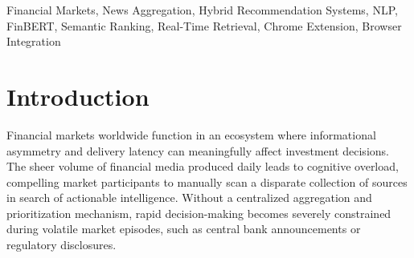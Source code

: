 \documentclass[conference]{IEEEtran}
\begin{document}
\begin{abstract}
Rapid growth in digital financial media has introduced substantial complexity in the timely processing and interpretation of market-sensitive content. Existing news platforms suffer from source fragmentation, irregular content freshness, and a near-total absence of user-adaptive features. In response to these shortcomings, this paper introduces \textit{FinMate.dev}, an extensible hybrid framework for real-time financial news aggregation and personalized recommendation. The system unifies multi-source RSS ingestion, content fingerprinting for deduplication, metadata normalization, distributed backend microservices, and a responsive client interface. A browser-native Chrome extension is also proposed, allowing users to access ranked financial content from within their active browsing session, removing the need to switch between applications. The ranking subsystem employs a composite scoring approach that fuses FinBERT-derived sentiment signals, transformer-based semantic embeddings, topic modeling outputs, and user behavioral analytics into a unified real-time scoring pipeline. Experimental validation demonstrates sustained ingestion throughput, sub-millisecond retrieval performance, and smooth rendering under large-scale financial feed conditions.
\end{abstract}

\begin{IEEEkeywords}
Financial Markets, News Aggregation, Hybrid Recommendation Systems, NLP, FinBERT, Semantic Ranking, Real-Time Retrieval, Chrome Extension, Browser Integration
\end{IEEEkeywords}

\section{Introduction}

Financial markets worldwide function in an ecosystem where informational asymmetry and delivery latency can meaningfully affect investment decisions. The sheer volume of financial media produced daily leads to cognitive overload, compelling market participants to manually scan a disparate collection of sources in search of actionable intelligence. Without a centralized aggregation and prioritization mechanism, rapid decision-making becomes severely constrained during volatile market episodes, such as central bank announcements or regulatory disclosures.
\end{document}
